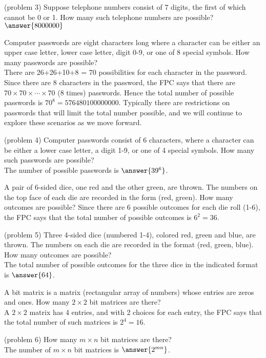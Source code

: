 \documentclass[handout]{ximera}
\begin{document}
\begin{problem}(problem 3)
Suppose telephone numbers consist of 7 digits, the first of which cannot be 0 or 1.  
How many such telephone numbers are possible?\\
$\answer{8000000}$

\end{problem}


\begin{example}[example 4]
Computer passwords are eight characters long where a character can be either an upper case letter, 
lower case letter, digit 0-9, or one of 8 special symbols. How many passwords are possible?\\
There are 26+26+10+8 = 70 possibilities for each character in the password. Since there are 8 characters in the password,
the FPC says that there are $70\times 70\times \cdots \times 70$ (8 times) passwords.
Hence the total number of possible passwords is $70^8 = 576480100000000$. 
Typically there are restrictions on passwords that will limit the total number possible, and we will 
continue to explore these scenarios as we move forward.
\end{example}

\begin{problem}(problem 4)
Computer passwords consist of 6 characters, where a character can be either a lower case letter, 
a digit 1-9, or one of 4 special symbols.  How many such passwords are possible?\\
The number of possible passwords is $\answer{39^6}$.
\end{problem} 

\begin{example}[example 5]
A pair of 6-sided dice, one red and the other green, are thrown. The numbers on the top face of each die are recorded
in the form (red, green). How many outcomes are possible?
Since there are 6 possible outcomes for each die roll (1-6), the FPC says that the total number of possible outcomes is $6^2 = 36$.
\end{example}

\begin{problem}(problem 5)
Three 4-sided dice (numbered 1-4), colored red, green and blue, are thrown. 
The numbers on each die are recorded in the format 
(red, green, blue).  How many outcomes are possible?\\
The total number of possible outcomes for the three dice in the indicated format is $\answer{64}$.
\end{problem} 


\begin{example}[example 6]
A bit matrix is a matrix (rectangular array of numbers) whose entries are zeros and ones. How many $2 \times 2$ bit matrices are there?\\
A $2\times 2$ matrix has 4 entries, and with 2 choices for each entry, the FPC says that the total number of such matrices is $2^4 = 16$.
\end{example}

\begin{problem}(problem 6)
How many $m \times n$ bit matrices are there?\\
The number of $m \times n$ bit matrices is $\answer{2^{mn}}$.
\end{problem}
\end{document}
